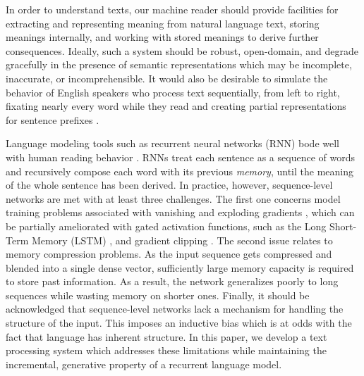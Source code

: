 \documentclass[11pt,letterpaper]{article}
\begin{document}
        


	In order to understand texts, our machine reader should
        provide facilities for extracting and representing meaning
        from natural language text, storing meanings internally, and
        working with stored meanings to derive further consequences.
        Ideally, such a system should be robust, open-domain, and
        degrade gracefully in the presence of semantic representations
        which may be incomplete, inaccurate, or incomprehensible.  It
        would also be desirable to simulate the behavior of English
        speakers who process text sequentially, from left to right,
        fixating nearly every word while they read
        \cite{rayner2009eye} and creating partial representations for
        sentence prefixes \cite{Konieczny:2000,Tanenhaus:ea:1995}.
        

        Language modeling tools such as recurrent neural networks
        (RNN) bode well with human reading behavior
        \cite{Frank:Bod:2011}.  RNNs treat each sentence as a sequence
        of words and recursively compose each word with its previous
        \textit{memory}, until the meaning of the whole sentence has
        been derived.  In practice, however, sequence-level networks
        are met with at least three challenges. The first one concerns
        model training problems associated with vanishing and
        exploding gradients
        \cite{hochreiter1991untersuchungen,bengio1994learning}, which
        can be partially ameliorated with gated activation functions,
        such as the Long Short-Term Memory (LSTM)
        \cite{hochreiter1997long}, and gradient clipping
        \cite{pascanu2012difficulty}. The second issue relates to
        memory compression problems. As the input sequence gets
        compressed and blended into a single dense vector,
        sufficiently large memory capacity is required to store past
        information. As a result, the network generalizes poorly to
        long sequences while wasting memory on shorter ones. Finally,
        it should be acknowledged that sequence-level networks lack a
        mechanism for handling the structure of the input. This
        imposes an inductive bias which is at odds with the fact that
        language has inherent structure. In this paper, we develop a
        text processing system which addresses these limitations while
        maintaining the incremental, generative property of a
        recurrent language model.
\end{document}
